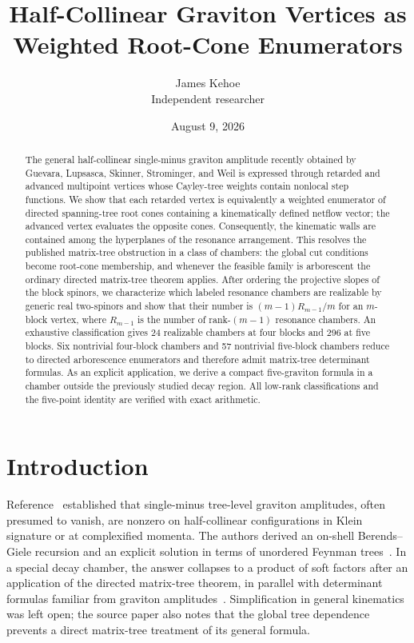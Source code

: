 \documentclass[11pt]{article}
\title{Half-Collinear Graviton Vertices as\\Weighted Root-Cone Enumerators}
\author{James Kehoe\\
\small Independent researcher}
\date{August 9, 2026}
\theoremstyle{definition}
\theoremstyle{remark}
\begin{document}
\maketitle

\begin{abstract}
The general half-collinear single-minus graviton amplitude recently obtained by
Guevara, Lupsasca, Skinner, Strominger, and Weil is expressed through retarded
and advanced multipoint vertices whose Cayley-tree weights contain nonlocal
step functions.  We show that each retarded vertex is equivalently a weighted
enumerator of directed spanning-tree root cones containing a kinematically
defined netflow vector; the advanced vertex evaluates the opposite cones.
Consequently, the kinematic walls are contained among the hyperplanes of the
resonance arrangement.  This resolves the published matrix-tree obstruction
in a class of chambers: the global cut conditions become root-cone membership,
and whenever the feasible family is arborescent the ordinary directed
matrix-tree theorem applies.  After ordering the projective slopes of the
block spinors, we characterize which labeled resonance chambers are realizable
by generic real two-spinors and show that their number is
$(m-1)R_{m-1}/m$ for an $m$-block vertex, where $R_{m-1}$ is the number of
rank-$(m-1)$ resonance chambers.  An exhaustive
classification gives 24 realizable chambers at four blocks and 296 at five
blocks.  Six nontrivial four-block chambers and 57 nontrivial five-block
chambers reduce to directed arborescence enumerators and therefore admit
matrix-tree determinant formulas.  As an explicit application, we derive a
compact five-graviton formula in a chamber outside the previously studied
decay region.  All low-rank classifications and the five-point identity are
verified with exact arithmetic.
\end{abstract}

\section{Introduction}

Reference~\cite{GuevaraGraviton} established that single-minus tree-level
graviton amplitudes, often presumed to vanish, are nonzero on half-collinear
configurations in Klein signature or at complexified momenta.  The authors
derived an on-shell Berends--Giele recursion and an explicit solution in terms
of unordered Feynman trees~\cite{BerendsGiele}.  In a special decay chamber,
the answer collapses to a product of soft factors after an application of the
directed matrix-tree theorem, in parallel with determinant formulas familiar
from graviton amplitudes~\cite{Hodges}.  Simplification in general kinematics
was left open; the source paper also notes that the global tree dependence
prevents a direct matrix-tree treatment of its general formula.
\end{document}
